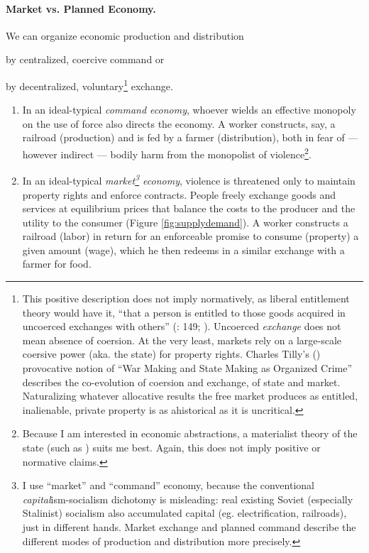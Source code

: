 \paragraph{Market vs. Planned Economy.} \label{sec:marketvscommand} We can organize economic production and distribution \begin{inparaenum}[1)] 
		\item by centralized, coercive command or
		\item by decentralized, voluntary\footnote{
				\label{fn:tilly}This positive description does not imply normatively, as liberal entitlement theory would have it, ``that a person is entitled to those goods acquired in uncoerced exchanges with others'' (\citealt{Nozick1974}: 149; \citealt{Friedman1962}). Uncoerced \emph{exchange} does not mean absence of coersion. At the very least, markets rely on a large-scale coersive power (aka. the state) for property rights. Charles Tilly's (\citeyear{Tilly-1985-aa}) provocative notion of ``War Making and State Making as Organized Crime'' describes the co-evolution of coersion and exchange, of state and market. Naturalizing whatever allocative results the free market produces as entitled, inalienable, private property is as ahistorical as it is uncritical.} 
			exchange. \end{inparaenum} 
	\begin{enumerate}
		\item In an ideal-typical \cite{Weber-1920-aa} \emph{command economy}, whoever wields an effective monopoly on the use of force also directs the economy. A worker constructs, say, a railroad (production) and is fed by a farmer (distribution), both in fear of --- however indirect --- bodily harm from the monopolist of violence\footnote{
				Because I am  interested in economic abstractions, a materialist theory of the state (such as \citealt{Tilly-1985-aa}) suits me best. Again, this does not imply positive or normative claims.}. 
		\item In an ideal-typical \emph{market\footnote{
				I use ``market'' and ``command'' economy, because the conventional \emph{capital}ism-socialism dichotomy is misleading: real existing Soviet (especially Stalinist) socialism also accumulated capital (eg. electrification, railroads), just in different hands. Market exchange and planned command describe the different modes of production and distribution more precisely.} 
			economy}, violence is threatened only to maintain property rights and enforce contracts. People freely exchange goods and services at equilibrium prices that balance the costs to the producer and the utility to the consumer (Figure \ref{fig:supplydemand}).  A worker constructs a railroad (labor) in return for an enforceable promise to consume (property) a given amount (wage), which he then redeems in a similar exchange with a farmer for food. 
	\end{enumerate}


